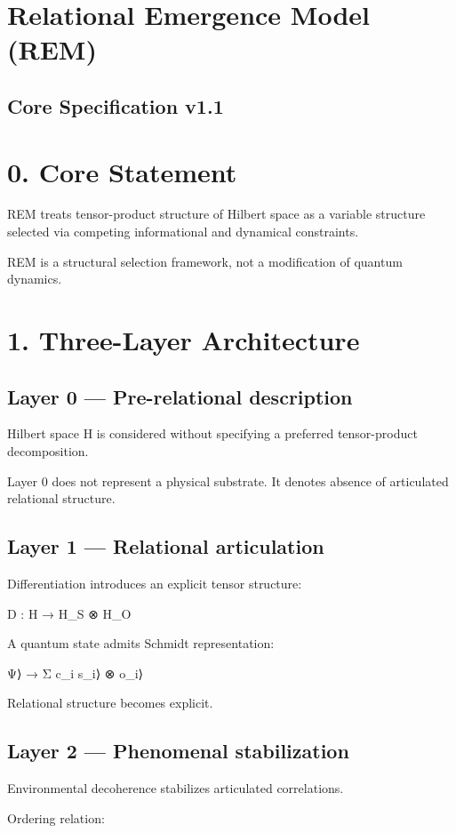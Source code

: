\documentclass[]{article}
\author{}
\date{}
\begin{document}
\section{Relational Emergence Model (REM)}
\subsection{Core Specification v1.1}

\section{0. Core Statement}
REM treats tensor-product structure of Hilbert space as a variable structure selected via competing informational and dynamical constraints.

REM is a structural selection framework, not a modification of quantum dynamics.

\section{1. Three-Layer Architecture}
\subsection{Layer 0 --- Pre-relational description}
Hilbert space H is considered without specifying a preferred tensor-product decomposition.

Layer 0 does not represent a physical substrate. It denotes absence of articulated relational structure.

\subsection{Layer 1 --- Relational articulation}
Differentiation introduces an explicit tensor structure:

D : H → H\_S ⊗ H\_O

A quantum state admits Schmidt representation:

\textbar Ψ⟩ → Σ c\_i \textbar s\_i⟩ ⊗ \textbar o\_i⟩

Relational structure becomes explicit.

\subsection{Layer 2 --- Phenomenal stabilization}
Environmental decoherence stabilizes articulated correlations.

Ordering relation:
\end{document}
